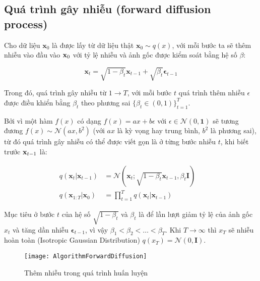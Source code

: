 \subsection{Quá trình gây nhiễu (forward diffusion process)}

Cho dữ liệu $\mathbf{x}_{0}$ là được lấy từ dữ liệu thật $\mathbf{x}_{0} \sim q(x)$, với mỗi bước ta sẽ thêm nhiễu vào đầu vào $\mathbf{x}_{0}$ với tỷ lệ nhiễu và ảnh gốc được kiểm soát bằng hệ số $\beta$:


\begin{equation}
	\label{eq:addgaussian}
	\mathbf{x}_t = \sqrt{1 - \beta_t}\mathbf{x}_{t-1} + \sqrt{\beta_t} \boldsymbol{\epsilon}_{t-1}
\end{equation}


Trong đó, quá trình gây nhiễu từ $1 \to T$, với mỗi bước $t$ quá trình thêm nhiễu $\epsilon$ được điều khiển bằng $\beta_t$ theo phương sai $\{\beta_t \in (0, 1)\}_{t=1}^T$.

Bởi vì một hàm $f(x)$ có dạng $f(x) = a x + b\epsilon$ với $\epsilon \in \mathcal{N}(0, \mathbf{1})$ sẽ tương đương $f(x) \sim \mathcal{N}(a x, b^2)$ (với $a x$ là kỳ vọng hay trung bình, $b^2$ là phương sai), từ đó quá trình gây nhiễu có thể được viết gọn là ở từng bước nhiễu $t$, khi biết trước $\mathbf{x}_{t-1}$ là:

\begin{equation}
	\label{eq:forward_diffusion_process}
	\begin{aligned}
		q(\mathbf{x}_t \vert \mathbf{x}_{t-1}) &= \mathcal{N}(\mathbf{x}_t; \sqrt{1 - \beta_t} \mathbf{x}_{t-1}, \beta_t\mathbf{I}) \quad \\
		q(\mathbf{x}_{1:T} \vert \mathbf{x}_0) &= \prod^T_{t=1} q(\mathbf{x}_t \vert \mathbf{x}_{t-1})
	\end{aligned}
\end{equation}

Mục tiêu ở bước $t$ của hệ số $\sqrt{1 - \beta_t}$ và $\beta_t$ là để lần lượt giảm tỷ lệ của ảnh gốc $x_t$ và tăng dần nhiễu  $\boldsymbol{\epsilon}_{t-1}$, vì vậy $\beta_1 < \beta_2 < \dots < \beta_T$. Khi $T \to \infty$ thì $x_{T}$ sẽ nhiễu hoàn toàn \cite{weng2021diffusion} (Isotropic Gaussian Distribution) $q(x_{T}) = \mathcal{N} (0, \mathbf{I})$.

\begin{figure}[H]
	\centering
	\texttt{[image: AlgorithmForwardDiffusion]}
	\caption{Thêm nhiễu trong quá trình huấn luyện}
	\label{fig:AlgorithmForwardDiffusion}
\end{figure}

